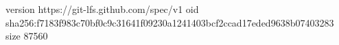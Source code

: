 version https://git-lfs.github.com/spec/v1
oid sha256:f7183f983c70bf0c9c31641f09230a1241403bcf2ccad17eded9638b07403283
size 87560

